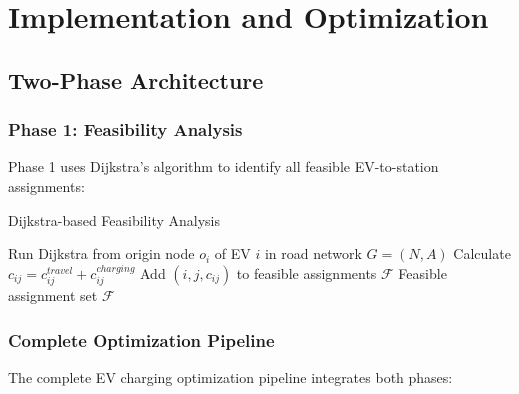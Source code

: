 \documentclass[12pt,a4paper]{article}
\begin{document}
\section{Implementation and Optimization}

\subsection{Two-Phase Architecture}

\subsubsection{Phase 1: Feasibility Analysis}

Phase 1 uses Dijkstra's algorithm to identify all feasible EV-to-station assignments:

\begin{algorithm}[H]
\caption{Dijkstra-based Feasibility Analysis}
\begin{algorithmic}[1]
    \STATE Run Dijkstra from origin node $o_i$ of EV $i$ in road network $G = (N, A)$
            \STATE Calculate $c_{ij} = c_{ij}^{travel} + c_{ij}^{charging}$
            \STATE Add $(i, j, c_{ij})$ to feasible assignments $\mathcal{F}$
        \ENDIF
    \ENDFOR
\ENDFOR
\RETURN Feasible assignment set $\mathcal{F}$
\end{algorithmic}
\end{algorithm}

\subsubsection{Complete Optimization Pipeline}

The complete EV charging optimization pipeline integrates both phases:
\end{document}
